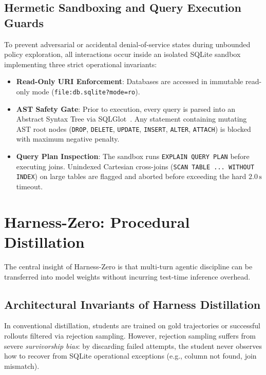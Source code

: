 \documentclass{article}
\theoremstyle{plain}
\theoremstyle{definition}
\theoremstyle{remark}
\begin{document}
\subsection{Hermetic Sandboxing and Query Execution Guards}
To prevent adversarial or accidental denial-of-service states during unbounded policy exploration, all interactions occur inside an isolated SQLite sandbox implementing three strict operational invariants:
\begin{itemize}[leftmargin=*,itemsep=1pt]
    \item \textbf{Read-Only URI Enforcement}: Databases are accessed in immutable read-only mode (\texttt{file:db.sqlite?mode=ro}).
    \item \textbf{AST Safety Gate}: Prior to execution, every query is parsed into an Abstract Syntax Tree via SQLGlot~\citep{sqlglot2023}. Any statement containing mutating AST root nodes (\texttt{DROP}, \texttt{DELETE}, \texttt{UPDATE}, \texttt{INSERT}, \texttt{ALTER}, \texttt{ATTACH}) is blocked with maximum negative penalty.
    \item \textbf{Query Plan Inspection}: The sandbox runs \texttt{EXPLAIN QUERY PLAN} before executing joins. Unindexed Cartesian cross-joins (\texttt{SCAN TABLE ... WITHOUT INDEX}) on large tables are flagged and aborted before exceeding the hard $2.0\,\text{s}$ timeout.
\end{itemize}

\section{Harness-Zero: Procedural Distillation}
\label{sec:harness_zero}

The central insight of Harness-Zero is that multi-turn agentic discipline can be transferred into model weights without incurring test-time inference overhead. 

\subsection{Architectural Invariants of Harness Distillation}
In conventional distillation, students are trained on gold trajectories or successful rollouts filtered via rejection sampling. However, rejection sampling suffers from severe \emph{survivorship bias}: by discarding failed attempts, the student never observes how to recover from SQLite operational exceptions (e.g., column not found, join mismatch). 
\end{document}
